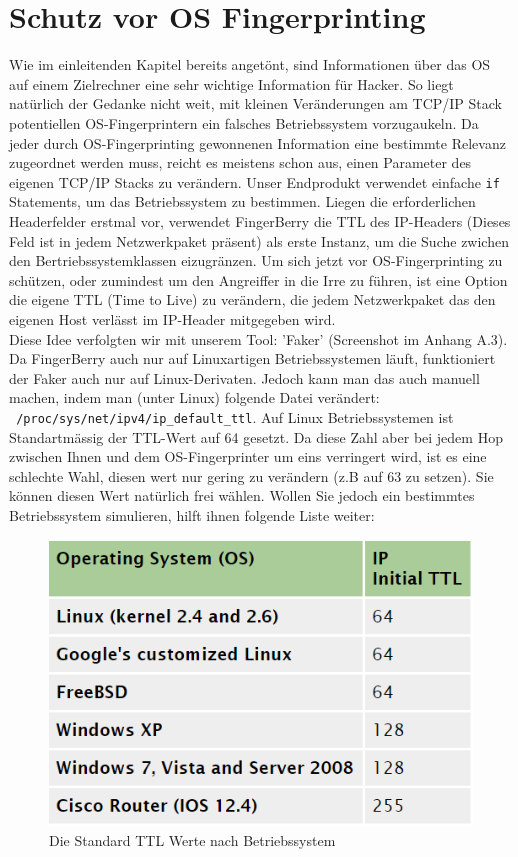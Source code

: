 \documentclass{article} %
\begin{document}
\section{Schutz vor OS Fingerprinting}
Wie im einleitenden Kapitel bereits angetönt, sind Informationen über das OS auf einem Zielrechner eine sehr wichtige Information für Hacker. So liegt natürlich der Gedanke nicht weit, mit kleinen Veränderungen am TCP/IP Stack potentiellen OS-Fingerprintern ein falsches Betriebssystem vorzugaukeln. Da jeder durch OS-Fingerprinting gewonnenen Information eine bestimmte Relevanz zugeordnet werden muss, reicht es meistens schon aus, einen Parameter des eigenen TCP/IP Stacks zu verändern. Unser Endprodukt verwendet einfache \texttt{if} Statements, um das Betriebssystem zu bestimmen. Liegen die erforderlichen Headerfelder erstmal vor, verwendet FingerBerry die TTL des IP-Headers (Dieses Feld ist in jedem Netzwerkpaket präsent) als erste Instanz, um die Suche zwichen den Bertriebssystemklassen  eizugränzen. Um sich jetzt vor OS-Fingerprinting zu schützen, oder zumindest um den Angreiffer in die Irre zu führen, ist eine Option die eigene TTL (Time to Live) zu verändern, die jedem Netzwerkpaket das den eigenen Host verlässt im IP-Header mitgegeben wird.\\
Diese Idee verfolgten wir mit unserem Tool: 'Faker' (Screenshot im Anhang A.3). Da FingerBerry auch nur auf Linuxartigen Betriebssystemen läuft, funktioniert der Faker auch nur auf Linux-Derivaten. Jedoch kann man das auch manuell machen, indem man (unter Linux) folgende Datei verändert:\\\texttt{~/proc/sys/net/ipv4/ip\_default\_ttl}. Auf Linux Betriebssystemen ist Standartmässig der TTL-Wert auf 64 gesetzt. Da diese Zahl aber bei jedem Hop zwischen Ihnen und dem OS-Fingerprinter um eins verringert wird, ist es eine schlechte Wahl, diesen wert nur gering zu verändern (z.B auf 63 zu setzen). Sie können diesen Wert natürlich frei wählen. Wollen Sie jedoch ein bestimmtes Betriebssystem simulieren, hilft ihnen folgende Liste weiter:
\begin{figure}[!h]
\begin{center}
\includegraphics[scale=0.8]{data/grafik6.png}
\captionsetup{singlelinecheck=off}
\caption[Titel]{
Die Standard TTL Werte nach Betriebssystem \cite{default_ttl_list}
}%
\label{Abb.54}
\end{center}
\end{figure}
\newpage
\end{document}
